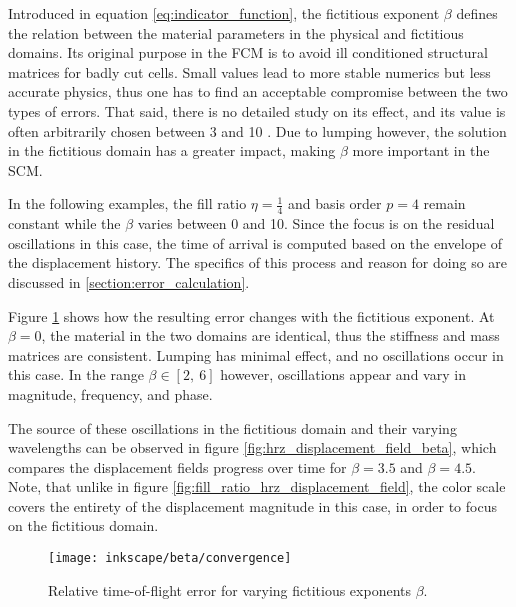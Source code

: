 Introduced in equation \ref{eq:indicator_function}, the fictitious exponent $\beta$ defines the relation between the material parameters in the physical and fictitious domains. Its original purpose in the FCM is to avoid ill conditioned structural matrices for badly cut cells. Small values lead to more stable numerics but less accurate physics, thus one has to find an acceptable compromise between the two types of errors. That said, there is no detailed study on its effect, and its value is often arbitrarily chosen between 3 and 10 \cite{Parvizian2007}. Due to lumping however, the solution in the fictitious domain has a greater impact, making $\beta$ more important in the SCM.

In the following examples, the fill ratio $\eta = \frac{1}{4}$ and basis order $p=4$ remain constant while the $\beta$ varies between 0 and 10. Since the focus is on the residual oscillations in this case, the time of arrival is computed based on the envelope of the displacement history. The specifics of this process and reason for doing so are discussed in \ref{section:error_calculation}.

Figure \ref{fig:beta_convergence} shows how the resulting error changes with the fictitious exponent. At $\beta = 0$, the material in the two domains are identical, thus the stiffness and mass matrices are consistent. Lumping has minimal effect, and no oscillations occur in this case. In the range $\beta \in [2,\ 6]$ however, oscillations appear and vary in magnitude, frequency, and phase.

The source of these oscillations in the fictitious domain and their varying wavelengths can be observed in figure \ref{fig:hrz_displacement_field_beta}, which compares the displacement fields progress over time for $\beta=3.5$ and $\beta=4.5$. Note, that unlike in figure \ref{fig:fill_ratio_hrz_displacement_field}, the color scale covers the entirety of the displacement magnitude in this case, in order to focus on the fictitious domain.

\begin{figure}[!h]
	\centering
	\texttt{[image: inkscape/beta/convergence]}
	\caption{Relative time-of-flight error for varying fictitious exponents $\beta$.}
	\label{fig:beta_convergence}
\end{figure}

